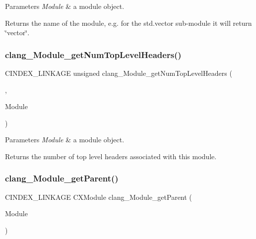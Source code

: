 \begin{DoxyParams}{Parameters}
{\em Module} & a module object.\\
\hline
\end{DoxyParams}
\begin{DoxyReturn}{Returns}
the name of the module, e.\+g. for the \textquotesingle{}std.\+vector\textquotesingle{} sub-\/module it will return \char`\"{}vector\char`\"{}. 
\end{DoxyReturn}
\mbox{\label{group__CINDEX__MODULE_gaee667293d56a18d3e8c17e37ce77cb0d}} 
\subsubsection{\texorpdfstring{clang\+\_\+\+Module\+\_\+get\+Num\+Top\+Level\+Headers()}{clang\_Module\_getNumTopLevelHeaders()}}
{\footnotesize\ttfamily C\+I\+N\+D\+E\+X\+\_\+\+L\+I\+N\+K\+A\+GE unsigned clang\+\_\+\+Module\+\_\+get\+Num\+Top\+Level\+Headers (\begin{DoxyParamCaption}\item[{\hyperlink{group__CINDEX_gacdb7815736ca709ce9a5e1ec2b7e16ac}{C\+X\+Translation\+Unit}}]{,  }\item[{C\+X\+Module}]{Module }\end{DoxyParamCaption})}


\begin{DoxyParams}{Parameters}
{\em Module} & a module object.\\
\hline
\end{DoxyParams}
\begin{DoxyReturn}{Returns}
the number of top level headers associated with this module. 
\end{DoxyReturn}
\mbox{\label{group__CINDEX__MODULE_ga62e149a28d71b719b11aefee3d36df53}} 
\subsubsection{\texorpdfstring{clang\+\_\+\+Module\+\_\+get\+Parent()}{clang\_Module\_getParent()}}
{\footnotesize\ttfamily C\+I\+N\+D\+E\+X\+\_\+\+L\+I\+N\+K\+A\+GE C\+X\+Module clang\+\_\+\+Module\+\_\+get\+Parent (\begin{DoxyParamCaption}\item[{C\+X\+Module}]{Module }\end{DoxyParamCaption})}


